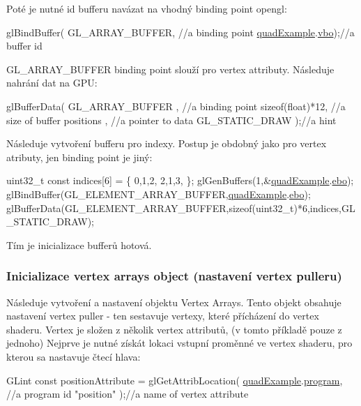 Poté je nutné id bufferu navázat na vhodný binding point opengl\-: 
\begin{DoxyCodeInclude}
  glBindBuffer(
      GL\_ARRAY\_BUFFER, \textcolor{comment}{//a binding point}
      \hyperlink{quadExample_8c_ad961415145a9c30bd9846d4a278cc63a}{quadExample}.\hyperlink{structQuadExampleVariables_a69515fd546272c117e14f784221f6412}{vbo});\textcolor{comment}{//a buffer id}
\end{DoxyCodeInclude}
G\-L\-\_\-\-A\-R\-R\-A\-Y\-\_\-\-B\-U\-F\-F\-E\-R binding point slouží pro vertex attributy. Následuje nahrání dat na G\-P\-U\-: 
\begin{DoxyCodeInclude}
  glBufferData(
      GL\_ARRAY\_BUFFER , \textcolor{comment}{//a binding point}
      \textcolor{keyword}{sizeof}(\textcolor{keywordtype}{float})*12, \textcolor{comment}{//a size of buffer}
      positions       , \textcolor{comment}{//a pointer to data}
      GL\_STATIC\_DRAW  );\textcolor{comment}{//a hint}
\end{DoxyCodeInclude}
Následuje vytvoření bufferu pro indexy. Postup je obdobný jako pro vertex atributy, jen binding point je jiný\-: 
\begin{DoxyCodeInclude}
  uint32\_t \textcolor{keyword}{const} indices[6] = \{
    0,1,2,
    2,1,3,
  \};
  glGenBuffers(1,&\hyperlink{quadExample_8c_ad961415145a9c30bd9846d4a278cc63a}{quadExample}.\hyperlink{structQuadExampleVariables_a3b1abdb0f18593a0ebec8dd9a222164b}{ebo});
  glBindBuffer(GL\_ELEMENT\_ARRAY\_BUFFER,\hyperlink{quadExample_8c_ad961415145a9c30bd9846d4a278cc63a}{quadExample}.\hyperlink{structQuadExampleVariables_a3b1abdb0f18593a0ebec8dd9a222164b}{ebo});
  glBufferData(GL\_ELEMENT\_ARRAY\_BUFFER,\textcolor{keyword}{sizeof}(uint32\_t)*6,indices,GL\_STATIC\_DRAW);
\end{DoxyCodeInclude}
Tím je inicializace bufferů hotová. \hypertarget{quadExample.c_VAO}{}\subsubsection{Inicializace vertex arrays object (nastavení vertex pulleru)}\label{quadExample.c_VAO}
Následuje vytvoření a nastavení objektu Vertex Arrays. Tento objekt obsahuje nastavení vertex puller -\/ ten sestavuje vertexy, které přícházení do vertex shaderu. Vertex je složen z několik vertex attributů, (v tomto příkladě pouze z jednoho) Nejprve je nutné získát lokaci vstupní proměnné ve vertex shaderu, pro kterou sa nastavuje čtecí hlava\-: 
\begin{DoxyCodeInclude}
  GLint \textcolor{keyword}{const} positionAttribute = glGetAttribLocation(
      \hyperlink{quadExample_8c_ad961415145a9c30bd9846d4a278cc63a}{quadExample}.\hyperlink{structQuadExampleVariables_a63971781ff860bd201886926f943ba78}{program}, \textcolor{comment}{//a program id}
      \textcolor{stringliteral}{"position"}         );\textcolor{comment}{//a name of vertex attribute}
\end{DoxyCodeInclude}
